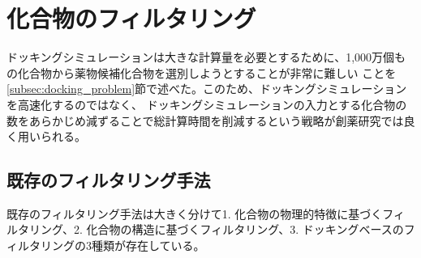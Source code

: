 \section{化合物のフィルタリング}
ドッキングシミュレーションは大きな計算量を必要とするために、1,000万個もの化合物から薬物候補化合物を選別しようとすることが非常に難しい
ことを\ref{subsec:docking_problem}節で述べた。このため、ドッキングシミュレーションを高速化するのではなく、
ドッキングシミュレーションの入力とする化合物の数をあらかじめ減ずることで総計算時間を削減するという戦略が創薬研究では良く用いられる。

\subsection{既存のフィルタリング手法}\label{subsec:existing_filtering}
既存のフィルタリング手法は大きく分けて1. 化合物の物理的特徴に基づくフィルタリング、2. 化合物の構造に基づくフィルタリング、3. ドッキングベースのフィルタリングの3種類が存在している。
